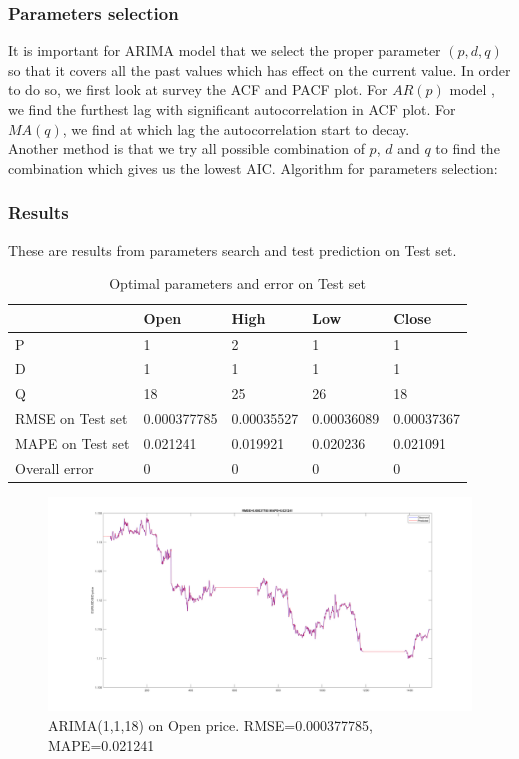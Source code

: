 \documentclass[11pt]{article}
\begin{document}
\subsubsection{Parameters selection}
It is important for ARIMA model that we select the proper parameter
$(p, d, q)$ so that it covers all the past values which has effect on the
current value. In order to do so, we first look at survey the ACF and PACF plot.
For ${AR}(p)$ model , we find the furthest lag with significant autocorrelation
in ACF plot. For
$MA(q)$, we find at which lag the autocorrelation start to decay.\\
Another method is that we try all possible combination of $p$, $d$ and $q$ to
find the combination which gives us the lowest AIC.
Algorithm for parameters selection:


\subsubsection{Results}
These are results from parameters search and test prediction on Test set.

\begin{table}[H]
\begin{tabular}{|l|l|l|l|l|}
\hline
                 & Open        & High       & Low        & Close      \\ \hline
P                & 1           & 2          & 1          & 1          \\ \hline
D                & 1           & 1          & 1          & 1          \\ \hline
Q                & 18          & 25         & 26         & 18         \\ \hline
RMSE on Test set & 0.000377785 & 0.00035527 & 0.00036089 & 0.00037367 \\ \hline
MAPE on Test set & 0.021241    & 0.019921   & 0.020236   & 0.021091   \\ \hline
Overall error    & 0           & 0          & 0          & 0          \\ \hline
\end{tabular}
\caption{Optimal parameters and error on Test set}
\end{table}

\begin{figure}[H]
  \centering
  \includegraphics[width=\textwidth,keepaspectratio]{figs/arima_1_1_18_open.png}
  \caption{ARIMA(1,1,18) on Open price. RMSE=0.000377785, MAPE=0.021241}
\end{figure}
\end{document}
